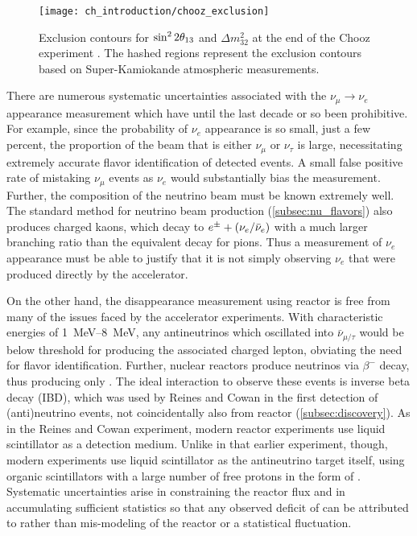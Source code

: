 \begin{figure}
    \centering
    \texttt{[image: ch\_introduction/chooz\_exclusion]}
    \caption[Constraint on \thetaot{} by Chooz]{
        Exclusion contours for $\sin^22\theta_{13}$ and $\Delta m^2_{32}$
        at the end of the Chooz experiment \cite{chooz1999}.
        The hashed regions represent the exclusion contours
        based on Super-Kamiokande atmospheric measurements.
    }
    \label{fig:chooz_exclusion}
\end{figure}


There are numerous systematic uncertainties associated with the $\nu_\mu\to\nu_e$ appearance measurement
which have until the last decade or so been prohibitive.
For example, since the probability of $\nu_e$ appearance is so small,
just a few percent,
the proportion of the beam that is either $\nu_\mu$ or $\nu_\tau$ is large,
necessitating extremely accurate flavor identification of detected events.
A small false positive rate of mistaking $\nu_\mu$ events as $\nu_e$
would substantially bias the measurement.
Further, the composition of the neutrino beam must be known extremely well.
The standard method for neutrino beam production (\cref{subsec:nu_flavors})
also produces charged kaons, which decay to $e^\pm + (\nu_e/\bar{\nu}_e)$
with a much larger branching ratio than the equivalent decay for pions.
Thus a measurement of $\nu_e$ appearance must be able to justify
that it is not simply observing $\nu_e$ that were produced directly
by the accelerator.

On the other hand, the disappearance measurement using reactor \nuebar{} is
free from many of the issues faced by the accelerator experiments.
With characteristic energies of \SIrange{1}{8}{\MeV},
any antineutrinos which oscillated into $\bar{\nu}_{\mu/\tau}$
would be below threshold for producing the associated charged lepton,
obviating the need for flavor identification.
Further, nuclear reactors produce neutrinos via $\beta^-$ decay,
thus producing only \nuebar{}.
The ideal interaction to observe these \nuebar{} events
is inverse beta decay (IBD),
which was used by Reines and Cowan in the first detection of (anti)neutrino events,
not coincidentally also from reactor \nuebar{} (\cref{subsec:discovery}).
As in the Reines and Cowan experiment,
modern reactor \nuebar{} experiments use liquid scintillator
as a detection medium.
Unlike in that earlier experiment, though,
modern experiments use liquid scintillator as the antineutrino target itself,
using organic scintillators with a large number of free protons
in the form of .
Systematic uncertainties arise in constraining the reactor \nuebar{} flux
and in accumulating sufficient statistics
so that any observed deficit of \nuebar{}
can be attributed to \thetaot{} rather than mis-modeling of the reactor
or a statistical fluctuation.

